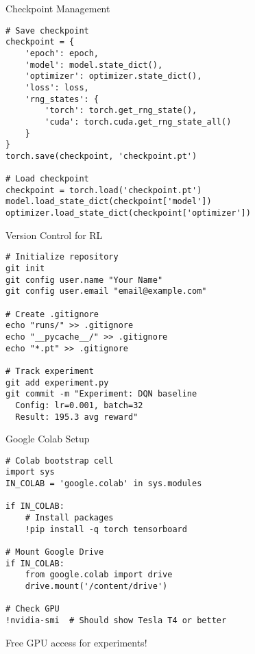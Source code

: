 \documentclass[aspectratio=169,10pt]{beamer}
\begin{document}
\begin{frame}[fragile]{Checkpoint Management}
\begin{lstlisting}
# Save checkpoint
checkpoint = {
    'epoch': epoch,
    'model': model.state_dict(),
    'optimizer': optimizer.state_dict(),
    'loss': loss,
    'rng_states': {
        'torch': torch.get_rng_state(),
        'cuda': torch.cuda.get_rng_state_all()
    }
}
torch.save(checkpoint, 'checkpoint.pt')

# Load checkpoint
checkpoint = torch.load('checkpoint.pt')
model.load_state_dict(checkpoint['model'])
optimizer.load_state_dict(checkpoint['optimizer'])
\end{lstlisting}
\end{frame}

\begin{frame}[fragile]{Version Control for RL}
\begin{lstlisting}
# Initialize repository
git init
git config user.name "Your Name"
git config user.email "email@example.com"

# Create .gitignore
echo "runs/" >> .gitignore
echo "__pycache__/" >> .gitignore
echo "*.pt" >> .gitignore

# Track experiment
git add experiment.py
git commit -m "Experiment: DQN baseline
  Config: lr=0.001, batch=32
  Result: 195.3 avg reward"
\end{lstlisting}
\end{frame}

\begin{frame}[fragile]{Google Colab Setup}
\begin{lstlisting}
# Colab bootstrap cell
import sys
IN_COLAB = 'google.colab' in sys.modules

if IN_COLAB:
    # Install packages
    !pip install -q torch tensorboard

# Mount Google Drive
if IN_COLAB:
    from google.colab import drive
    drive.mount('/content/drive')

# Check GPU
!nvidia-smi  # Should show Tesla T4 or better
\end{lstlisting}

Free GPU access for experiments!
\end{frame}
\end{document}
